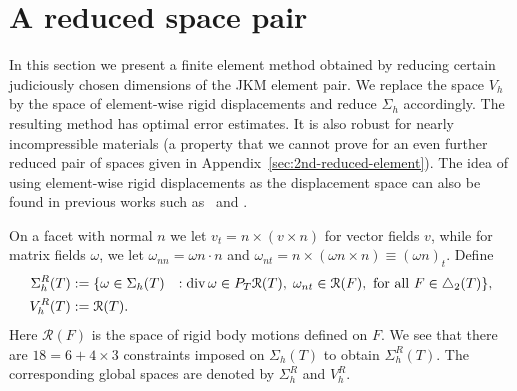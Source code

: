 \documentclass[12pt]{amsart}
\numberwithin{equation}{section}
\newcommand{\og}{\omega}
\theoremstyle{definition}
\theoremstyle{remark}
\renewcommand{\(}{\bigl(}
\renewcommand{\)}{\bigr)}
\newcommand{\dive}{{\ensuremath\mathop{\mathrm{div}\,}}} %
\newcommand{\revj}[1]{{\color{black}#1}}
\newcommand{\RM}{\mathcal{R}}
\begin{document}
\section{A reduced space pair}
\label{sec:reduced-element}

In this section we present a finite element method obtained by
reducing certain judiciously chosen dimensions of the JKM element pair.
We replace the space $V_h$ by the space of element-wise rigid displacements
and reduce  $\Sigma_h$  accordingly.  The resulting method has optimal error estimates. It is
also robust for nearly incompressible materials (a property that
we cannot prove for an even further reduced pair of spaces given in
Appendix~\ref{sec:2nd-reduced-element}).
\revj{The idea of using
  element-wise rigid displacements as the displacement space
  can also be found in previous works such as~\cite{PitkaStenb83} and \cite{christiansen2019finite}.}


On a facet with normal
$n$ we let $v_t = n \times ( v \times n)$ for vector fields $v$, while
for matrix fields $\og$, we let $\og_{nn} = \og n \cdot n$ and
$\og_{nt} = n \times ( \og n \times n) \equiv (\og n )_t$.
Define
\begin{alignat*}{3}
  \Sigma_h^R(T)
  & :=\{ \omega \in \Sigma_h(T)
  & : \; &  \dive \omega \in P_T \RM(T),\;
        \og_{nt} \in \RM(F),
        {\text{ for all }} F \in \triangle_2(T)\},\\
  V_h^R(T)  & := \RM(T).
\end{alignat*}
Here $\RM(F)$ is the space of rigid body motions defined on $F$.
We see that there are $18=6+4 \times 3$ constraints imposed on $\Sigma_h(T)$ to obtain $\Sigma_h^R(T)$. The corresponding global spaces are denoted by $\Sigma_h^R$ and $V_h^R$.
\end{document}
